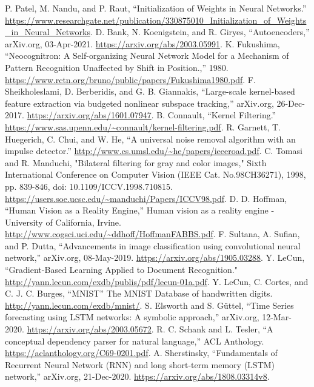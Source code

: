 \documentclass[conference]{IEEEtran}
\begin{document}
\begin{thebibliography}{00}
 P. Patel, M. Nandu, and P. Raut, “Initialization of Weights in Neural Networks.” \url{https://www.researchgate.net/publication/330875010_Initialization_of_Weights_in_Neural_Networks}.
 D. Bank, N. Koenigstein, and R. Giryes, “Autoencoders,” arXiv.org, 03-Apr-2021. \url{https://arxiv.org/abs/2003.05991}.
 K. Fukushima, “Neocognitron: A Self-organizing Neural Network Model for a Mechanism of Pattern Recognition Unaffected by Shift in Position.,” 1980. \url{https://www.rctn.org/bruno/public/papers/Fukushima1980.pdf}. 
 F. Sheikholeslami, D. Berberidis, and G. B. Giannakis, “Large-scale kernel-based feature extraction via budgeted nonlinear subspace tracking,” arXiv.org, 26-Dec-2017. \url{https://arxiv.org/abs/1601.07947}. 
 B. Connault, “Kernel Filtering.” \url{https://www.sas.upenn.edu/~connault/kernel-filtering.pdf}. 
 R. Garnett, T. Huegerich, C. Chui, and W. He, “A universal noise removal algorithm with an impulse detector.” \url{http://www.cs.umsl.edu/~he/papers/ieeeroad.pdf}. 
 C. Tomasi and R. Manduchi, "Bilateral filtering for gray and color images," Sixth International Conference on Computer Vision (IEEE Cat. No.98CH36271), 1998, pp. 839-846, doi: 10.1109/ICCV.1998.710815. \url{https://users.soe.ucsc.edu/~manduchi/Papers/ICCV98.pdf}.
 D. D. Hoffman, “Human Vision as a Reality Engine,” Human vision as a reality engine - University of California, Irvine. \url{http://www.cogsci.uci.edu/~ddhoff/HoffmanFABBS.pdf}.
 F. Sultana, A. Sufian, and P. Dutta, “Advancements in image classification using convolutional neural network,” arXiv.org, 08-May-2019. \url{https://arxiv.org/abs/1905.03288}. 
 Y. LeCun, “Gradient-Based Learning Applied to Document Recognition." \url{http://yann.lecun.com/exdb/publis/pdf/lecun-01a.pdf}.
 Y. LeCun, C. Cortes, and C. J. C. Burges, “MNIST” The MNIST Database of handwritten digits. \url{http://yann.lecun.com/exdb/mnist/}. 
 S. Elsworth and S. Güttel, “Time Series forecasting using LSTM networks: A symbolic approach,” arXiv.org, 12-Mar-2020. \url{https://arxiv.org/abs/2003.05672}. 
 R. C. Schank and L. Tesler, “A conceptual dependency parser for natural language,” ACL Anthology. \url{https://aclanthology.org/C69-0201.pdf}. 
 A. Sherstinsky, “Fundamentals of Recurrent Neural Network (RNN) and long short-term memory (LSTM) network,” arXiv.org, 21-Dec-2020. \url{https://arxiv.org/abs/1808.03314v8}. 

\end{thebibliography}
\end{document}
